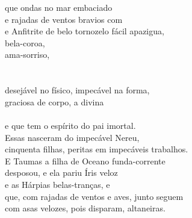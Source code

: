 \begin{pages}
\begin{Rightside}
 que ondas no mar embaciado\\
e rajadas de ventos bravios com \\
e Anfitrite de belo tornozelo fácil apazigua,\\
   bela-coroa, \\
 ama-sorriso, \\
  \\
  \\
 desejável no físico, impecável na forma,\\
 graciosa de corpo, a divina  \\
   \\
e  que tem o espírito do pai imortal.\\
Essas nasceram do impecável Nereu,\\
cinquenta filhas, peritas em impecáveis trabalhos.\\

\quad{}E Taumas a filha de Oceano funda-corrente \\
desposou,  e ela pariu Íris veloz\\
e as Hárpias belas-tranças,  e \\
que, com rajadas de ventos e aves, junto seguem\\
com asas velozes, pois disparam, altaneiras.\\

\smallskip
\begin{center}\end{center}
\smallskip


\end{Rightside}
\end{pages}
